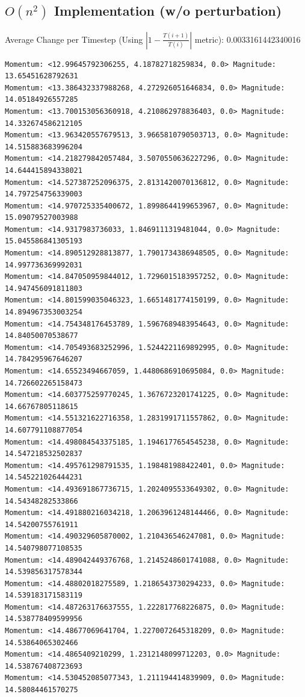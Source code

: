\documentclass[10pt]{article}
\begin{document}
\subsection{$O(n^2)$ Implementation (w/o perturbation)}
Average Change per Timestep (Using $|1 - \frac{T(i+1)}{T(i)}|$ metric): 0.0033161442340016
\footnotesize
\begin{verbatim}
Momentum: <12.99645792306255, 4.18782718259834, 0.0> Magnitude: 13.65451628792631
Momentum: <13.386432337988268, 4.272926051646834, 0.0> Magnitude: 14.05184926557285
Momentum: <13.700153056360918, 4.210862978836403, 0.0> Magnitude: 14.332674586212105
Momentum: <13.963420557679513, 3.9665810790503713, 0.0> Magnitude: 14.515883683996204
Momentum: <14.218279842057484, 3.5070550636227296, 0.0> Magnitude: 14.644415894338021
Momentum: <14.527387252096375, 2.8131420070136812, 0.0> Magnitude: 14.797254756339003
Momentum: <14.970725335400672, 1.8998644199653967, 0.0> Magnitude: 15.09079527003988
Momentum: <14.9317983736033, 1.8469111319481044, 0.0> Magnitude: 15.045586841305193
Momentum: <14.890512928813877, 1.7901734386948505, 0.0> Magnitude: 14.997736369992031
Momentum: <14.847050959844012, 1.7296015183957252, 0.0> Magnitude: 14.947456091811803
Momentum: <14.801599035046323, 1.6651481774150199, 0.0> Magnitude: 14.894967353003254
Momentum: <14.754348176453789, 1.5967689483954643, 0.0> Magnitude: 14.84050070538677
Momentum: <14.705493683252996, 1.5244221169892995, 0.0> Magnitude: 14.784295967646207
Momentum: <14.65523494667059, 1.4480686910695084, 0.0> Magnitude: 14.726602265158473
Momentum: <14.603775259770245, 1.3676723201741225, 0.0> Magnitude: 14.66767805118615
Momentum: <14.551321622716358, 1.2831991711557862, 0.0> Magnitude: 14.607791108877054
Momentum: <14.498084543375185, 1.1946177654545238, 0.0> Magnitude: 14.547218532502837
Momentum: <14.495761298791535, 1.198481988422401, 0.0> Magnitude: 14.545221026444231
Momentum: <14.493691867736715, 1.2024095533649302, 0.0> Magnitude: 14.54348282533866
Momentum: <14.491880216034218, 1.2063961248144466, 0.0> Magnitude: 14.54200755761911
Momentum: <14.490329605870002, 1.210436546247081, 0.0> Magnitude: 14.540798077108535
Momentum: <14.489042449376768, 1.2145248601741088, 0.0> Magnitude: 14.539856317578344
Momentum: <14.48802018275589, 1.2186543730294233, 0.0> Magnitude: 14.539183171583119
Momentum: <14.487263176637555, 1.222817768226875, 0.0> Magnitude: 14.538778409599956
Momentum: <14.48677069641704, 1.2270072645318209, 0.0> Magnitude: 14.53864065302466
Momentum: <14.4865409210299, 1.2312148099712203, 0.0> Magnitude: 14.538767408723693
Momentum: <14.530452085077343, 1.211194414839909, 0.0> Magnitude: 14.58084461570275

\end{verbatim}
\end{document}
